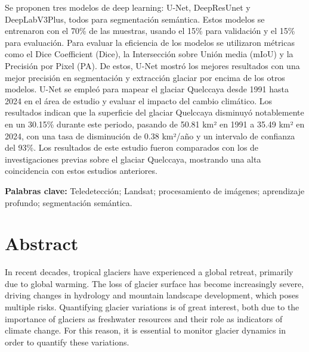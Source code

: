 Se proponen tres modelos de deep learning: U-Net, DeepResUnet y DeepLabV3Plus, todos para segmentación semántica. Estos modelos se entrenaron con el 70\% de las muestras, usando el 15\% para validación y el 15\% para evaluación. Para evaluar la eficiencia de los modelos se utilizaron métricas como el Dice Coefficient (Dice), la Intersección sobre Unión media (mIoU) y la Precisión por Pixel (PA). De estos, U-Net mostró los mejores resultados con una mejor precisión en segmentación y extracción glaciar por encima de los otros modelos. U-Net se empleó para mapear el glaciar Quelccaya desde 1991 hasta 2024 en el área de estudio y evaluar el impacto del cambio climático. Los resultados indican que la superficie del glaciar Quelccaya disminuyó notablemente en un 30.15\% durante este periodo, pasando de 50.81 km² en 1991 a 35.49 km² en 2024, con una tasa de disminución de 0.38 km²/año y un intervalo de confianza del 93\%. Los resultados de este estudio fueron comparados con los de investigaciones previas sobre el glaciar Quelccaya, mostrando una alta coincidencia con estos estudios anteriores.



\textbf{Palabras clave:} Teledetección; Landsat;  procesamiento de imágenes; aprendizaje profundo; segmentación semántica.
\singlespacing

\chapter*{Abstract}
\doublespacing
In recent decades, tropical glaciers have experienced a global retreat, primarily due to global warming. The loss of glacier surface has become increasingly severe, driving changes in hydrology and mountain landscape development, which poses multiple risks. Quantifying glacier variations is of great interest, both due to the importance of glaciers as freshwater resources and their role as indicators of climate change. For this reason, it is essential to monitor glacier dynamics in order to quantify these variations.


